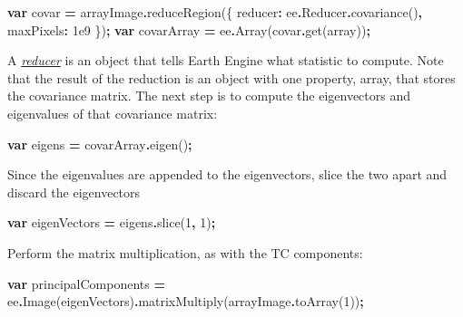 \documentclass[
]{article}
\newenvironment{Shaded}{\begin{snugshade}}{\end{snugshade}}
\newcommand{\AttributeTok}[1]{\textcolor[rgb]{0.77,0.63,0.00}{#1}}
\newcommand{\DataTypeTok}[1]{\textcolor[rgb]{0.13,0.29,0.53}{#1}}
\newcommand{\DecValTok}[1]{\textcolor[rgb]{0.00,0.00,0.81}{#1}}
\newcommand{\FloatTok}[1]{\textcolor[rgb]{0.00,0.00,0.81}{#1}}
\newcommand{\FunctionTok}[1]{\textcolor[rgb]{0.00,0.00,0.00}{#1}}
\newcommand{\KeywordTok}[1]{\textcolor[rgb]{0.13,0.29,0.53}{\textbf{#1}}}
\newcommand{\NormalTok}[1]{#1}
\newcommand{\OperatorTok}[1]{\textcolor[rgb]{0.81,0.36,0.00}{\textbf{#1}}}
\newcommand{\StringTok}[1]{\textcolor[rgb]{0.31,0.60,0.02}{#1}}
\begin{document}
\begin{Shaded}
\begin{Highlighting}[]
\KeywordTok{var}\NormalTok{ covar }\OperatorTok{=}\NormalTok{ arrayImage}\OperatorTok{.}\FunctionTok{reduceRegion}\NormalTok{(\{}
  \DataTypeTok{reducer}\OperatorTok{:}\NormalTok{ ee}\OperatorTok{.}\AttributeTok{Reducer}\OperatorTok{.}\FunctionTok{covariance}\NormalTok{()}\OperatorTok{,}
  \DataTypeTok{maxPixels}\OperatorTok{:} \FloatTok{1e9}
\NormalTok{\})}\OperatorTok{;}
\KeywordTok{var}\NormalTok{ covarArray }\OperatorTok{=}\NormalTok{ ee}\OperatorTok{.}\FunctionTok{Array}\NormalTok{(covar}\OperatorTok{.}\FunctionTok{get}\NormalTok{(}\StringTok{\textquotesingle{}array\textquotesingle{}}\NormalTok{))}\OperatorTok{;}  
\end{Highlighting}
\end{Shaded}

A \href{https://developers.google.com/earth-engine/reducers_intro}{\emph{reducer}} is an object that tells Earth Engine what statistic to compute. Note that the result of the reduction is an object with one property, array, that stores the covariance matrix. The next step is to compute the eigenvectors and eigenvalues of that covariance matrix:

\begin{Shaded}
\begin{Highlighting}[]
\KeywordTok{var}\NormalTok{ eigens }\OperatorTok{=}\NormalTok{ covarArray}\OperatorTok{.}\FunctionTok{eigen}\NormalTok{()}\OperatorTok{;}  
\end{Highlighting}
\end{Shaded}

Since the eigenvalues are appended to the eigenvectors, slice the two apart and discard the eigenvectors

\begin{Shaded}
\begin{Highlighting}[]
\KeywordTok{var}\NormalTok{ eigenVectors }\OperatorTok{=}\NormalTok{ eigens}\OperatorTok{.}\FunctionTok{slice}\NormalTok{(}\DecValTok{1}\OperatorTok{,} \DecValTok{1}\NormalTok{)}\OperatorTok{;}  
\end{Highlighting}
\end{Shaded}

Perform the matrix multiplication, as with the TC components:

\begin{Shaded}
\begin{Highlighting}[]
\KeywordTok{var}\NormalTok{ principalComponents }\OperatorTok{=}\NormalTok{  ee}\OperatorTok{.}\FunctionTok{Image}\NormalTok{(eigenVectors)}\OperatorTok{.}\FunctionTok{matrixMultiply}\NormalTok{(arrayImage}\OperatorTok{.}\FunctionTok{toArray}\NormalTok{(}\DecValTok{1}\NormalTok{))}\OperatorTok{;}  
\end{Highlighting}
\end{Shaded}
\end{document}
